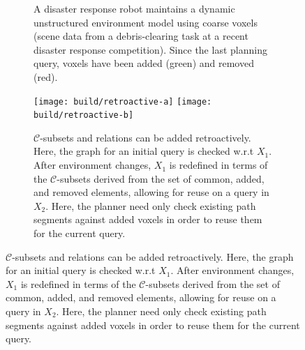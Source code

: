 \begin{figure}
\centering

\begin{subfigure}[b]{\linewidth}
\centering
{}
\caption{A disaster response robot maintains a
  dynamic unstructured environment model
  using coarse voxels
  (scene data from a debris-clearing task at a
  recent disaster response competition).
  Since the last planning query,
  voxels have been added (green) and removed (red).}
\label{fig:chimp-voxels-delta}
\end{subfigure}

\vspace{0.1in}

\begin{subfigure}[b]{\linewidth}
\centering
\texttt{[image: build/retroactive-a]}
\texttt{[image: build/retroactive-b]}
\caption{
  $\mathcal{C}$-subsets and relations
  can be added retroactively.
  Here, the graph for an initial query is checked w.r.t $X_1$.
  After environment changes,
  $X_1$ is redefined in terms of the $\mathcal{C}$-subsets
  derived from the set of common, added, and removed elements,
  allowing for reuse on a query in $X_2$.
  Here,
  the planner need only check existing path segments
  against added voxels in order to reuse them for the current query.}
\label{fig:retroactive}
\end{subfigure}


\end{figure}
